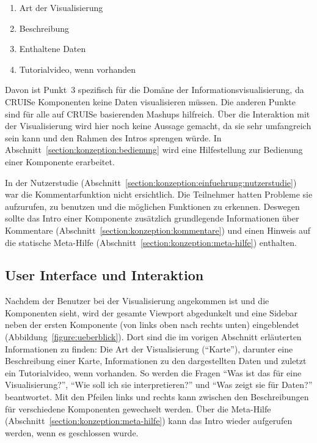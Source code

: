 \documentclass[
	headsepline,
	footsepline,
	fontsize=12pt,
	bibliography=totoc
]{scrbook}
\begin{document}
\begin{enumerate}
	\item Art der Visualisierung
	\item Beschreibung
	\item Enthaltene Daten
	\item Tutorialvideo, wenn vorhanden
\end{enumerate}

Davon ist Punkt~3 spezifisch für die Domäne der Informationsvisualisierung, da CRUISe Komponenten keine Daten visualisieren müssen. Die anderen Punkte sind für alle auf CRUISe basierenden Mashups hilfreich. Über die Interaktion mit der Visualisierung wird hier noch keine Aussage gemacht, da sie sehr umfangreich sein kann und den Rahmen des Intros sprengen würde. In Abschnitt~\ref{section:konzeption:bedienung} wird eine Hilfestellung zur Bedienung einer Komponente erarbeitet.


In der Nutzerstudie (Abschnitt~\ref{section:konzeption:einfuehrung:nutzerstudie}) war die Kommentarfunktion nicht ersichtlich. Die Teilnehmer hatten Probleme sie aufzurufen, zu benutzen und die möglichen Funktionen zu erkennen. Deswegen sollte das Intro einer Komponente zusätzlich grundlegende Informationen über Kommentare (Abschnitt~\ref{section:konzeption:kommentare}) und einen Hinweis auf die statische Meta-Hilfe (Abschnitt~\ref{section:konzeption:meta-hilfe}) enthalten.

\subsection{User Interface und Interaktion}
\label{section:konzeption:intro:ui}

Nachdem der Benutzer bei der Visualisierung angekommen ist und die Komponenten sieht, wird der gesamte Viewport abgedunkelt und eine Sidebar neben der ersten Komponente (von links oben nach rechts unten) eingeblendet (Abbildung~\ref{figure:ueberblick}). Dort sind die im vorigen Abschnitt erläuterten Informationen zu finden: Die Art der Visualisierung (\enquote{Karte}), darunter eine Beschreibung einer Karte, Informationen zu den dargestellten Daten und zuletzt ein Tutorialvideo, wenn vorhanden. So werden die Fragen \enquote{Was ist das für eine Visualisierung?}, \enquote{Wie soll ich sie interpretieren?} und \enquote{Was zeigt sie für Daten?} beantwortet. Mit den Pfeilen links und rechts kann zwischen den Beschreibungen für verschiedene Komponenten gewechselt werden. Über die Meta-Hilfe (Abschnitt~\ref{section:konzeption:meta-hilfe}) kann das Intro wieder aufgerufen werden, wenn es geschlossen wurde.
\end{document}
